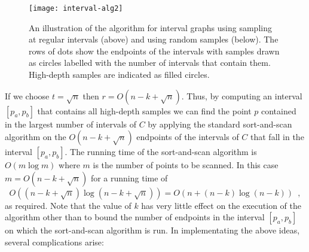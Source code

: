 \documentclass[12pt]{article}
\begin{document}
\begin{figure}
\begin{center}\texttt{[image: interval-alg2]}\end{center}
\caption{An illustration of the algorithm for interval graphs
using sampling at regular intervals (above) and using random samples
(below).  
The rows of dots show
the endpoints of the intervals with samples drawn as circles labelled with the number
of intervals that contain them.  High-depth samples are indicated as
filled circles.}
\end{figure}

If we choose $t=\sqrt{n}$ then $r=O(n-k+\sqrt{n})$.  Thus, by
computing an interval $[p_a,p_b]$ that contains all high-depth samples
we can find the point $p$ contained in the largest number of
intervals of $C$ by applying the standard sort-and-scan algorithm
on the $O(n-k+\sqrt{n})$ endpoints of the intervals of $C$ that fall
in the interval $[p_a,p_b]$.  The running time of the
sort-and-scan algorithm is $O(m\log m)$ where $m$ is the number of
points to be scanned.  In this case $m=O(n-k+\sqrt{n})$ for a running
time of 
\[
   O((n-k+\sqrt{n})\log(n-k+\sqrt n)) = O(n + (n-k)\log (n-k)) \enspace ,
\]
as required.  Note that the value of $k$ has very little effect on the
execution of the algorithm other than to bound the number of endpoints
in the interval $[p_a,p_b]$ on which the sort-and-scan algorithm is
run.
In implementating the above ideas, several complications arise:
\end{document}

